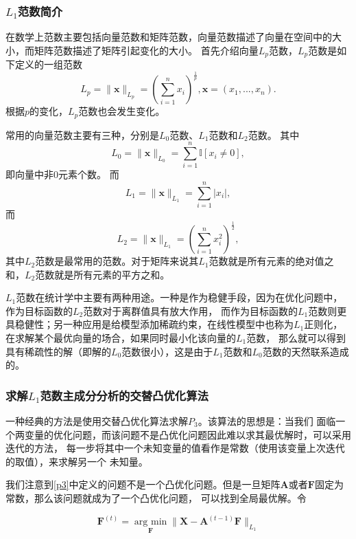 \subsubsection{$L_1$范数简介}
在数学上范数主要包括向量范数和矩阵范数，向量范数描述了向量在空间中的大小，而矩阵范数描述了矩阵引起变化的大小。
首先介绍向量$L_p$范数，$L_p$范数是如下定义的一组范数
\begin{equation}
    L_p = \| \bm x\|_{L_p} = (\sum_{i=1}^n x_i)^{\frac{1}{p}}, \bm x= (x_1, ..., x_n).
\end{equation}
根据$p$的变化，$L_p$范数也会发生变化。

常用的向量范数主要有三种，分别是$L_0$范数、$L_1$范数和$L_2$范数。
其中$$L_0 = \| \bm x\|_{L_0} = \sum_{i=1}^n\mathbb I[x_i \neq 0],$$即向量中非0元素个数。
而$$L_1 = \| \bm x\|_{L_1} = \sum_{i=1}^n|x_i|,$$而$$L_2 = \|\bm x \|_{L_1} = (\sum_{i=1}^n x_i^2)^{\frac1{2}},$$
其中$L_2$范数是最常用的范数。对于矩阵来说其$L_1$范数就是所有元素的绝对值之和，$L_2$范数就是所有元素的平方之和。

$L_1$范数在统计学中主要有两种用途。一种是作为稳健手段，因为在优化问题中，作为目标函数的$L_2$范数对于离群值具有放大作用，
而作为目标函数的$L_1$范数则更具稳健性；另一种应用是给模型添加稀疏约束，在线性模型中也称为$L_1$正则化，
在求解某个最优向量的场合，如果同时最小化该向量的$L_1$范数，
那么就可以得到具有稀疏性的解（即解的$L_0$范数很小），这是由于$L_1$范数和$L_0$范数的天然联系造成的。


\subsubsection{求解$L_1$范数主成分分析的交替凸优化算法}

一种经典的方法是使用交替凸优化算法\cite{ke2005robust}求解$P_3$。该算法的思想是：当我们
面临一个两变量的优化问题，而该问题不是凸优化问题因此难以求其最优解时，可以采用迭代的方法，
每一步将其中一个未知变量的值看作是常数（使用该变量上次迭代的取值），来求解另一个
未知量。

我们注意到\eqref{p3}中定义的问题不是一个凸优化问题。但是一旦矩阵$\bm{A}$或者$\bm{F}$固定为常数，那么该问题就成为了一个凸优化问题，
可以找到全局最优解。令

\begin{equation}\label{pro1}
\bm F^{(t)} = \underset{\bm F}{\operatorname{arg\ min}} \|\bm{X} - \bm{A}^{(t-1)}\bm{F} \|_{L_1} 
\end{equation}

